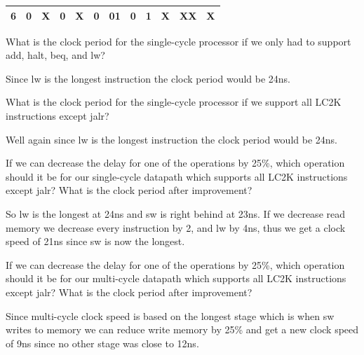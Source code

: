 \documentclass[12pt, letterpaper]{article}
\begin{document}
\begin{table}[H]
\begin{tabular}{|l|l|l|l|l|l|l|l|l|l|l|l|}
    6     & 0                                                 & X                                                    & 0                                                  & X                                                   & 0                                                 & 01                                                   & 0                                                     & 1                                                  & X                                                    & XX                                                   & X                                                  \\ \hline
    \end{tabular}
\end{table}

\begin{subproblem}{}
    What is the clock period for the single-cycle processor if we only had to support add, halt, beq, and lw? 
\end{subproblem}
Since lw is the longest instruction the clock period would be 24ns.

\begin{subproblem}{}
    What is the clock period for the single-cycle processor if we support all LC2K instructions except jalr?
\end{subproblem}
Well again since lw is the longest instruction the clock period would be 24ns.

\begin{subproblem}{}
    If we can decrease the delay for one of the operations by 25\%, which operation should it be for our single-cycle datapath which supports all LC2K instructions except jalr? 
    What is the clock period after improvement?
\end{subproblem}
    So lw is the longest at 24ns and sw is right behind at 23ns. If we decrease read memory we decrease every instruction by 2, and lw by 4ns, thus we get a clock speed of 21ns since sw is now the longest.

\begin{subproblem}{}
    If we can decrease the delay for one of the operations by 25\%, which operation should it be for our multi-cycle datapath which supports all LC2K instructions except jalr? What is the clock period after improvement? 
\end{subproblem}
Since multi-cycle clock speed is based on the longest stage which is when sw writes to memory we can reduce write memory by 25\% and get a new clock speed of 9ns since no other stage was close to 12ns.
\end{document}
